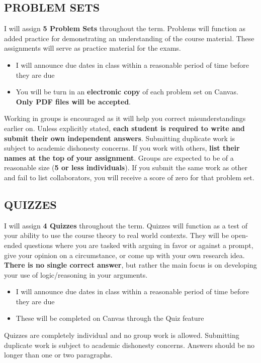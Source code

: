\documentclass[11pt]{article}
\begin{document}
\subsection*{PROBLEM SETS}
I will assign \textbf{5 Problem Sets} throughout the term. 
Problems will function as added practice for demonstrating an understanding of the course material. 
These assignments will serve as practice material for the exams. 
\begin{itemize}
    \item I will announce due dates in class within a reasonable period of time before they are due
    \item You will be turn in an \textbf{electronic copy} of each problem set on Canvas. 
    \textbf{Only PDF files will be accepted}.
\end{itemize}
Working in groups is encouraged as it will help you correct misunderstandings earlier on. 
Unless explicitly stated, \textbf{each student is required to write and submit their own independent answers}. 
Submitting duplicate work is subject to academic dishonesty concerns. 
If you work with others, \textbf{list their names at the top of your assignment}. 
Groups are expected to be of a reasonable size (\textbf{5 or less individuals}). 
If you submit the same work as other and fail to list collaborators, you will receive a score of zero for that problem set. 

\subsection*{QUIZZES}
I will assign \textbf{4 Quizzes} throughout the term. 
Quizzes will function as a test of your ability to use the course theory to real world contexts. 
They will be open-ended questions where you are tasked with arguing in favor or against a prompt, give your opinion on a circumstance, or come up with your own research idea. 
\textbf{There is no single correct answer}, but rather the main focus is on developing your use of logic/reasoning in your arguments. 

\begin{itemize}
    \item I will announce due dates in class within a reasonable period of time before they are due
    \item These will be completed on Canvas through the Quiz feature
\end{itemize}
Quizzes are completely individual and no group work is allowed. 
Submitting duplicate work is subject to academic dishonesty concerns. 
Answers should be no longer than one or two paragraphs. 
\end{document}
